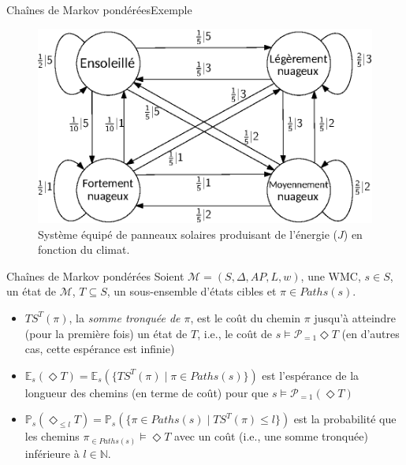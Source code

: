 \documentclass[compress]{beamer}
\begin{document}
\begin{frame}{Chaînes de Markov pondérées}{Exemple}
\begin{figure}
  \includegraphics[width=0.8\linewidth]{resources/weather}
  \caption{Système équipé de panneaux solaires produisant de l'énergie ($J$) en fonction du climat.}
\end{figure}
\end{frame}

\begin{frame}{Chaînes de Markov pondérées}
    Soient $\mathcal{M} = (S, \Delta, AP, L, w)$, une WMC, $s \in S$, un état
    de $\mathcal{M}$, $T \subseteq S$, un sous-ensemble d'états cibles et $\pi \in Paths(s)$.
  \begin{itemize}
  \item $TS^T(\pi)$, la \textit{\color{fibeamer@orange}somme tronquée de $\pi$}, est le coût du chemin $\pi$ jusqu'à atteindre {(pour la première fois)} un état de $T$, i.e., le coût de $s \models \mathcal{P}_{=1} \Diamond T$ (en d'autres cas, cette espérance est infinie)
  \item $\mathbb{E}_s(\Diamond T) = \mathbb{E}_s(\{ TS^T(\pi) \; | \; \pi \in Paths(s)  \})$ est l'espérance de la longueur des chemins (en terme de coût) pour que $s \models \mathcal{P}_{=1}(\Diamond T)$
  \item $\mathbb{P}_s(\Diamond_{\leq l}T) = \mathbb{P}_s(\{ \pi \in Paths(s) \; | \; TS^T(\pi) \leq l \})$ est la probabilité que les chemins $\pi_{\in Paths(s)} \models \Diamond T$ avec un coût (i.e., une somme tronquée) inférieure à $l \in \mathbb{N}$.
  \end{itemize}
\end{frame}
\end{document}
